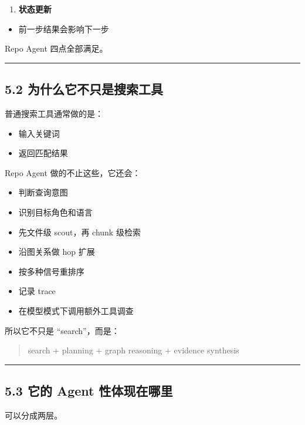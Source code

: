 \documentclass[UTF8,12pt,openany]{ctexbook}
\begin{document}
\begin{enumerate}
\item \textbf{状态更新}
\end{enumerate}
\begin{itemize}
\item 前一步结果会影响下一步
\end{itemize}

Repo Agent 四点全部满足。\par

\hrule

\subsection{5.2 为什么它不只是搜索工具}

普通搜索工具通常做的是：\par

\begin{itemize}
\item 输入关键词
\item 返回匹配结果
\end{itemize}

Repo Agent 做的不止这些，它还会：\par

\begin{itemize}
\item 判断查询意图
\item 识别目标角色和语言
\item 先文件级 scout，再 chunk 级检索
\item 沿图关系做 hop 扩展
\item 按多种信号重排序
\item 记录 trace
\item 在模型模式下调用额外工具调查
\end{itemize}

所以它不只是 “search”，而是：\par

\begin{quote}
search + planning + graph reasoning + evidence synthesis
\end{quote}

\hrule

\subsection{5.3 它的 Agent 性体现在哪里}

可以分成两层。\par
\end{document}
